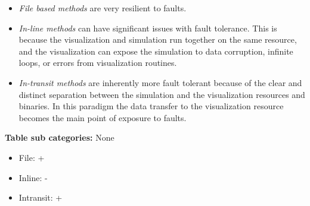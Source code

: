 \begin{itemize}
    \item \emph{File based methods} are very resilient to faults.
    
    \item \emph{In-line methods} can have significant issues with fault tolerance. This is because the visualization and simulation run together on the same resource, and the visualization can expose the simulation to data corruption, infinite loops, or errors from visualization routines.
    
    \item \emph{In-transit methods} are inherently more fault tolerant because of the clear and distinct separation between the simulation and the visualization resources and binaries. In this paradigm the data transfer to the visualization resource becomes the main point of exposure to faults.
\end{itemize}
\textbf{Table sub categories:} None
\begin{itemize}
    \item File: +
    \item Inline: -
    \item Intransit: +
\end{itemize}


